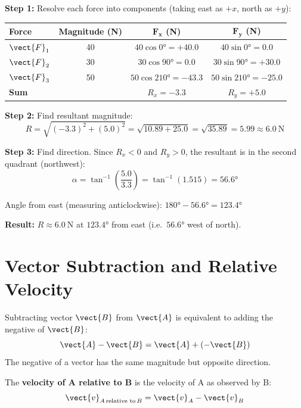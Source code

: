 \begin{solutionbox}
\textbf{Step 1:} Resolve each force into components
(taking east as $+x$, north as $+y$):

\begin{center}
\begin{tabular}{lccc}
\toprule
\textbf{Force} & \textbf{Magnitude (N)} &
$\mathbf{F_x}$ \textbf{(N)} &
$\mathbf{F_y}$ \textbf{(N)}\\
\midrule
$\vect{F}_1$ & 40 &
  $40\cos 0° = +40.0$ &
  $40\sin 0° = 0.0$\\
$\vect{F}_2$ & 30 &
  $30\cos 90° = 0.0$ &
  $30\sin 90° = +30.0$\\
$\vect{F}_3$ & 50 &
  $50\cos 210° = -43.3$ &
  $50\sin 210° = -25.0$\\
\midrule
\textbf{Sum} & & $R_x = -3.3$ & $R_y = +5.0$\\
\bottomrule
\end{tabular}
\end{center}

\textbf{Step 2:} Find resultant magnitude:
\[
  R = \sqrt{(-3.3)^2 + (5.0)^2}
  = \sqrt{10.89 + 25.0}
  = \sqrt{35.89}
  = 5.99 \approx 6.0\ \text{N}
\]

\textbf{Step 3:} Find direction. Since $R_x < 0$ and
$R_y > 0$, the resultant is in the second quadrant
(northwest):
\[
  \alpha = \tan^{-1}\!\left(\frac{5.0}{3.3}\right)
  = \tan^{-1}(1.515) = 56.6°
\]

Angle from east (measuring anticlockwise):
$180° - 56.6° = 123.4°$

\textbf{Result:} $R \approx 6.0\ \text{N}$ at $123.4°$
from east (i.e.\ $56.6°$ west of north).
\end{solutionbox}

\section{Vector Subtraction and Relative Velocity}

\begin{definitionbox}
Subtracting vector $\vect{B}$ from $\vect{A}$ is equivalent
to adding the negative of $\vect{B}$:
\[
  \vect{A} - \vect{B} = \vect{A} + (-\vect{B})
\]
The negative of a vector has the same magnitude but
opposite direction.
\end{definitionbox}

\begin{definitionbox}
The \textbf{velocity of A relative to B} is the velocity
of A as observed by B:
\[
  \vect{v}_{A\,\text{relative to}\,B}
  = \vect{v}_A - \vect{v}_B
\]
\end{definitionbox}

